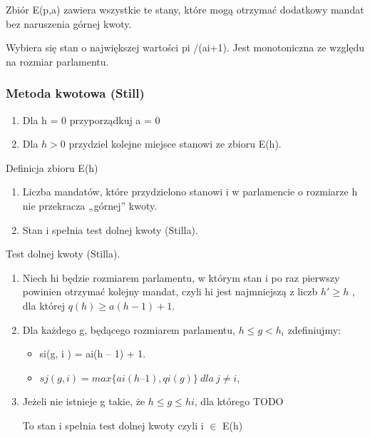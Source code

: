 \documentclass[12pt,a4paper]{article}
\begin{document}
Zbiór E(p,a) zawiera wszystkie te stany, które mogą otrzymać dodatkowy mandat bez naruszenia górnej kwoty.

Wybiera się stan o największej wartości pi /(ai+1). Jest monotoniczna ze względu na rozmiar parlamentu. 

\subsubsection{Metoda kwotowa (Still)}
\begin{enumerate}
\item Dla h = 0 przyporządkuj a = 0
\item Dla $h > 0$ przydziel kolejne miejsce stanowi ze
zbioru E(h).
\end{enumerate}

Definicja zbioru E(h)
\begin{enumerate}
\item  Liczba mandatów, które przydzielono stanowi i w parlamencie o rozmiarze h nie przekracza „górnej” kwoty.
\item Stan i spełnia test dolnej kwoty (Stilla).
\end{enumerate}

Test dolnej kwoty (Stilla).
\begin{enumerate}
\item Niech hi będzie rozmiarem parlamentu, w którym stan i po raz pierwszy powinien
otrzymać kolejny mandat, czyli hi jest najmniejszą z liczb 
$h' \geq h $ , dla której  $q (h )  \geq a  (h -1 )+1. $ 
\item Dla każdego g, będącego rozmiarem parlamentu, $h \leq g < h_i $ zdefiniujmy:
\begin{itemize}
\item si(g, i ) = ai(h – 1) + 1.
\item $sj(g, i ) = max \lbrace ai(h – 1), qi(g) \rbrace \  dla \  j \neq i $,
\end{itemize}
\item Jeżeli nie istnieje g takie, że $h \leqslant g \leqslant hi $, dla którego TODO

To stan i spełnia test dolnej kwoty czyli i $ \in $ E(h)
\end{enumerate}
\end{document}
